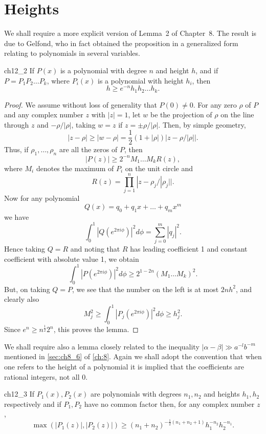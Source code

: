 \section{Heights}

We shall require a more explicit version of Lemma~2 of Chapter~8. The result is due to Gelfond, who in fact obtained the proposition in a generalized form relating to polynomials in several variables.

\begin{mylemma}{}{ch12_2}
If $P(x)$ is a polynomial with degree $n$ and height $h$, and if $P = P_1 P_2 \dots P_k$, where $P_i(x)$ is a polynomial with height $h_i$, then
\[h \geqslant e^{-n} h_1 h_2 \dots h_k.\]
\end{mylemma}

\begin{proof}
We assume without loss of generality that $P(0) \neq 0$. For any zero $\rho$ of $P$ and any complex number $z$ with $|z| = 1$, let $w$ be the projection of $\rho$ on the line through $z$ and $-\rho/|\rho|$, taking $w = z$ if $z = \pm \rho/|\rho|$. Then, by simple geometry,
\[|z-\rho| \ge |w-\rho| = \frac{1}{2}(1+|\rho|)|z-\rho/|\rho||.\]
Thus, if $\rho_1, \ldots, \rho_n$ are all the zeros of $P$, then
\[|P(z)| \geqslant 2^{-n} M_1 \dots M_k R(z),\]
where $M_i$ denotes the maximum of $P_i$ on the unit circle and
\[R(z) = \prod_{j=1}^{n} |z - \rho_j/|\rho_j||.\]
Now for any polynomial
\[Q(x) = q_0 + q_1 x + \dots + q_m x^m\]
we have
\[\int_0^1 |Q(e^{2\pi i\phi})|^2 d\phi = \sum_{j=0}^m |q_j|^2.\]
Hence taking $Q = R$ and noting that $R$ has leading coefficient 1 and constant coefficient with absolute value 1, we obtain
\[\int_0^1 |P(e^{2\pi i\phi})|^2 d\phi \geqslant 2^{1-2n} (M_1 \dots M_k)^2.\]
But, on taking $Q = P$, we see that the number on the left is at most $2nh^2$, and clearly also
\[M_j^2 \geqslant \int_0^1 |P_j(e^{2\pi i\phi})|^2 d\phi \geqslant h_j^2.\]
Since $e^n \ge n^{\frac{1}{2}} 2^n$, this proves the lemma.
\end{proof}

We shall require also a lemma closely related to the inequality
$|\alpha - \beta| \gg a^{-l}b^{-m}$ mentioned in \autoref{sec:ch8_6} of \autoref{ch:8}. Again we shall adopt
the convention that when one refers to the height of a polynomial it is
implied that the coefficients are rational integers, not all $0$.

\begin{mylemma}{}{ch12_3}
If $P_1(x), P_2(x)$ are polynomials with degrees $n_1, n_2$ and heights $h_1, h_2$ respectively and if $P_1, P_2$ have no common factor then, for any complex number $z$,
\[\max(|P_1(z)|, |P_2(z)|) \ge (n_1 + n_2)^{-\frac{1}{2}(n_1 + n_2 + 1)} h_1^{-n_2} h_2^{-n_1}.\]
\end{mylemma}

